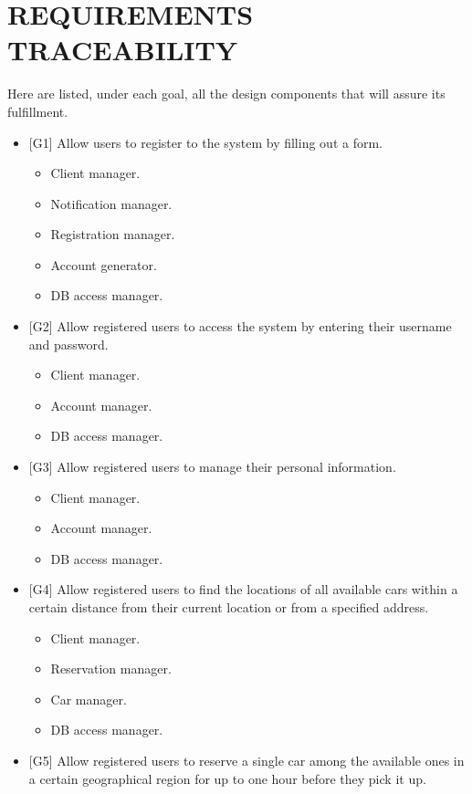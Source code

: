 \section{REQUIREMENTS  TRACEABILITY} 
Here are listed, under each goal, all the design components that will assure its fulfillment.
\begin{itemize}
	\item {[G1]} Allow users to register to the system by filling out a form.
	\begin{itemize}
		\item Client manager.
		\item Notification manager.
		\item Registration manager.
		\item Account generator.
		\item DB access manager.
	\end{itemize} 
	\item {[G2]} Allow registered users to access the system by entering their username and password.
	\begin{itemize}
		\item Client manager.
		\item Account manager.
		\item DB access manager.
	\end{itemize} 
	\item {[G3]} Allow registered users to manage their personal information.
	\begin{itemize}
		\item Client manager.
		\item Account manager.
		\item DB access manager.
	\end{itemize} 
	\item {[G4]} Allow registered users to find the locations of all available cars within a certain distance from their current location or from a specified address.
	\begin{itemize}
		\item Client manager.
		\item Reservation manager.
		\item Car manager.
		\item DB access manager.
	\end{itemize} 
	\item {[G5]} Allow registered users to reserve a single car among the available ones in a certain geographical region for up to one hour before they pick it up.
	\begin{itemize}

\end{itemize}
\end{itemize}
